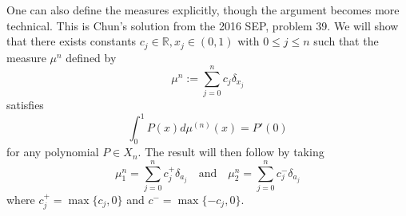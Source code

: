 \documentclass[answers]{exam}
\theoremstyle{problemstyle}
\newcommand{\1}[1]{\textbf{1}_{\left[#1\right]}} %
\def\R{\mathbb{R}} %
\begin{document}
\begin{questions}
\begin{parts}
\begin{solution}
	One can also define the measures explicitly, though the argument becomes more technical. This is Chun's solution from the 2016 SEP, problem 39. We will show that there exists constants $c_{j}\in \R, x_{j}\in (0,1)$ with $0\leq j\leq n$ such that the measure $\mu^{n}$ defined by
  \begin{equation}\label{eq:mu-form}
    \mu^{n}:= \sum_{j=0}^{n}c_{j}\delta_{x_{j}}
  \end{equation}
  satisfies
  \[ \int_0^1 P(x) d\mu^{(n)}(x) = P'(0) \]
  for any polynomial $P \in X_n$. The result will then follow by taking
  \begin{equation*}
    \mu_{1}^{n} = \sum_{j=0}^{n}c_{j}^{+}\delta_{a_{j}} \quad \text{and}\quad    \mu_{2}^{n} = \sum_{j=0}^{n}c_{j}^{-}\delta_{a_{j}}
  \end{equation*}
  where $c_{j}^{+}=\max\{c_{j},0\}$ and $c^{-}= \max\{-c_{j},0\}$.


\end{solution}
\end{parts}
\end{questions}
\end{document}
